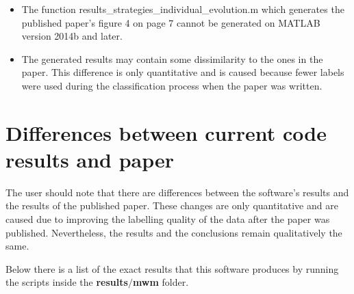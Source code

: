 \documentclass[12pt,titlepage]{article}
\begin{document}
\begin{doublespace}
\begin{itemize}
	\item The function results\_strategies\_individual\_evolution.m which generates the published paper's figure 4 on page 7 cannot be generated on MATLAB version 2014b and later.
	\item The generated results may contain some dissimilarity to the ones in the paper. This difference is only quantitative and is caused because fewer labels were used during the classification process when the paper was written. 
\end{itemize}


\section{Differences between current code results and paper}
The user should note that there are differences between the software's results and the results of the published paper. These changes are only quantitative and are caused due to improving the labelling quality of the data after the paper was published. Nevertheless, the results and the conclusions remain qualitatively the same.

Below there is a list of the exact results that this software produces by running the scripts inside the \textbf{results$/$mwm} folder.\\


\end{doublespace}
\end{document}
